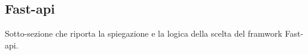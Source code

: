 \subsection{Fast-api}

Sotto-sezione che riporta la spiegazione e la logica della scelta del framwork Fast-api.
